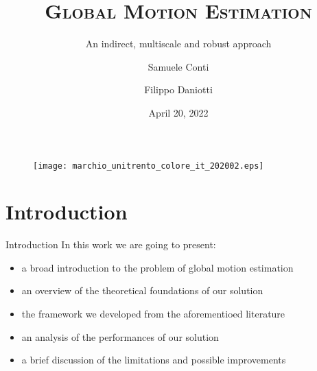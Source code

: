 \documentclass[aspectratio=1610,xcolor=dvipsnames]{beamer}
\author[Conti \and Daniotti]{Samuele Conti \and Filippo Daniotti}
\title[Global Motion Estimation]{\textsc{Global Motion Estimation}}
\subtitle{An indirect, multiscale and robust approach}
\institute[DISI - University of Trento]{Department of Information Engineering\\and Computer Science}
\date{April 20, 2022}
\begin{document}
\begin{frame}
    \titlepage
    \begin{figure}[H]
        \begin{center}
            \texttt{[image: marchio\_unitrento\_colore\_it\_202002.eps]}
        \end{center}
    \end{figure}
\end{frame}

\begin{frame}
    \tableofcontents[sectionstyle=show,subsectionstyle=show/shaded/hide,subsubsectionstyle=show/shaded/hide]
\end{frame}

\section{Introduction}
\begin{frame}{Introduction}
    In this work we are going to present:
    \begin{itemize}
        \item a broad introduction to the problem of global motion estimation
        \item an overview of the theoretical foundations of our solution
        \item the framework we developed from the aforementioed literature
        \item an analysis of the performances of our solution 
        \item a brief discussion of the limitations and possible improvements
    \end{itemize}
\end{frame}
\end{document}

